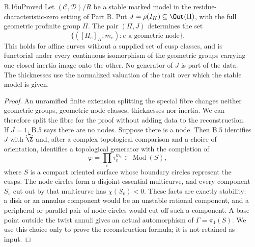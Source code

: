 \begin{claim}{B.16u}{Proved}
Let $(\mathcal C,\mathcal D)/R$ be a stable marked model in the
residue-characteristic-zero setting of Part B. Put
$J=\rho(I_K)\subseteq\Out(\Pi)$, with the full geometric profinite
group $\Pi$. The pair $(\Pi,J)$ determines the set
\[
 \{([\Pi_e]_{\Pi},m_e):e\text{ a geometric node}\}.
\]
This holds for affine curves without a supplied set of cusp classes,
and is functorial under every continuous isomorphism of the geometric
groups carrying one closed inertia image onto the other. No generator
of $J$ is part of the data. The thicknesses use the normalized valuation
of the trait over which the stable model is given.
\end{claim}
\begin{proof}
An unramified finite extension splitting the special fibre changes neither
geometric groups, geometric node classes, thicknesses nor inertia. We can
therefore split the fibre for the proof without adding data to the
reconstruction. If $J=1$, B.5 says there are no nodes. Suppose there is a
node. Then B.5 identifies $J$ with $\widehat\Z$ and, after a complex
topological comparison and a choice of orientation, identifies a
topological generator with the completion of
\[
 \varphi=\prod_e\tau_e^{m_e}\in\operatorname{Mod}(S),
\]
where $S$ is a compact oriented surface whose boundary circles represent
the cusps. The node circles form a disjoint essential multicurve, and
every component $S_v$ cut out by that multicurve has $\chi(S_v)<0$.
These facts are exactly stability: a disk or an annulus component would
be an unstable rational component, and a peripheral or parallel pair
of node circles would cut off such a component. A base point outside
the twist annuli gives an actual automorphism of
$\Gamma=\pi_1(S)$. We use this choice only to prove the reconstruction
formula; it is not retained as input.


\end{proof}
